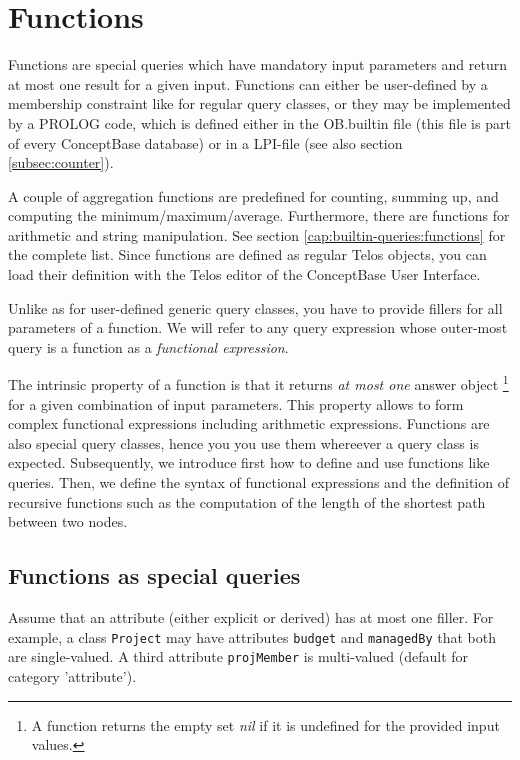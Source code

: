 \section{Functions}
\label{sec:functions}

Functions are special queries which have mandatory input parameters
and return at most one result for a given input.
Functions can either be user-defined by a membership constraint like
for regular query classes, or they may be implemented by a PROLOG
code, which is defined either in the OB.builtin file (this file is part of
every ConceptBase database) or in a LPI-file (see also section \ref{subsec:counter}).

A couple of aggregation functions are predefined for counting, summing up, and computing the minimum/maximum/average.
Furthermore, there are functions for arithmetic and string manipulation.
See section \ref{cap:builtin-queries:functions} for the complete list.
Since functions are defined as regular Telos objects, you can load their
definition with the Telos editor of the ConceptBase User Interface. 

Unlike as for user-defined generic query classes, you have to provide fillers for
all parameters of a function.
We will refer to any query expression whose outer-most query is a function as
a {\em functional expression}.

The intrinsic property of a function is that it returns {\em at most one\/} answer object%
\footnote{A function returns the empty set {\em nil} if it is undefined for the provided input
values.} for a given combination of input parameters. This property allows to form complex
functional expressions including arithmetic expressions. Functions are also
special query classes, hence you you use them whereever a query class is expected.
Subsequently, we introduce first how to define and use functions
like queries. Then, we define the syntax of functional expressions and the definition of
recursive functions such as the computation of the length of the shortest path between
two nodes.



\subsection{Functions as special queries}

Assume that an attribute (either explicit or derived) has at most one filler. For example,
a class {\tt Project} may have attributes {\tt budget}  and {\tt managedBy} that both are single-valued.
A third attribute {\tt projMember} is multi-valued (default for category 'attribute').

